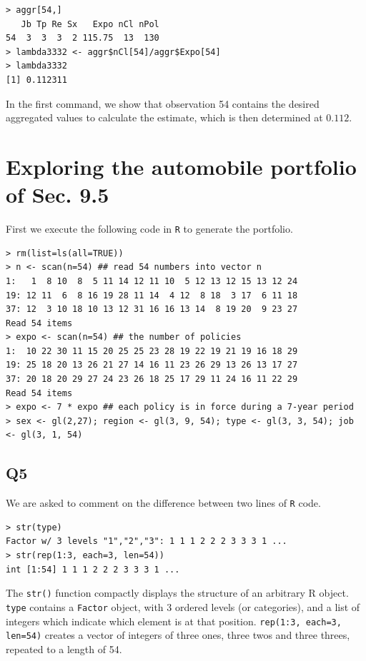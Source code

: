 \documentclass[11pt]{article}
\begin{document}
\begin{verbatim}
> aggr[54,]
   Jb Tp Re Sx   Expo nCl nPol
54  3  3  3  2 115.75  13  130
> lambda3332 <- aggr$nCl[54]/aggr$Expo[54]
> lambda3332
[1] 0.112311
\end{verbatim}

In the first command, we show that observation 54 contains the desired aggregated values to calculate the estimate, which is then determined at $0.112$.

\section{Exploring the automobile portfolio of Sec. 9.5}

First we execute the following code in \verb|R| to generate the portfolio.

\begin{verbatim}
> rm(list=ls(all=TRUE)) 
> n <- scan(n=54) ## read 54 numbers into vector n
1:   1  8 10  8  5 11 14 12 11 10  5 12 13 12 15 13 12 24
19: 12 11  6  8 16 19 28 11 14  4 12  8 18  3 17  6 11 18
37: 12  3 10 18 10 13 12 31 16 16 13 14  8 19 20  9 23 27
Read 54 items
> expo <- scan(n=54) ## the number of policies 
1:  10 22 30 11 15 20 25 25 23 28 19 22 19 21 19 16 18 29
19: 25 18 20 13 26 21 27 14 16 11 23 26 29 13 26 13 17 27
37: 20 18 20 29 27 24 23 26 18 25 17 29 11 24 16 11 22 29
Read 54 items
> expo <- 7 * expo ## each policy is in force during a 7-year period
> sex <- gl(2,27); region <- gl(3, 9, 54); type <- gl(3, 3, 54); job <- gl(3, 1, 54)
\end{verbatim}

\subsection*{Q5}

We are asked to comment on the difference between two lines of \verb|R| code.

\begin{verbatim}
> str(type)
Factor w/ 3 levels "1","2","3": 1 1 1 2 2 2 3 3 3 1 ...
> str(rep(1:3, each=3, len=54))
int [1:54] 1 1 1 2 2 2 3 3 3 1 ...
\end{verbatim}

The \verb|str()| function compactly displays the structure of an arbitrary R object.
\verb|type| contains a \verb|Factor| object, with 3 ordered levels (or categories), and a list of integers which indicate which element is at that position.
\verb|rep(1:3, each=3, len=54)| creates a vector of integers of three ones, three twos and three threes, repeated to a length of 54.
\end{document}
